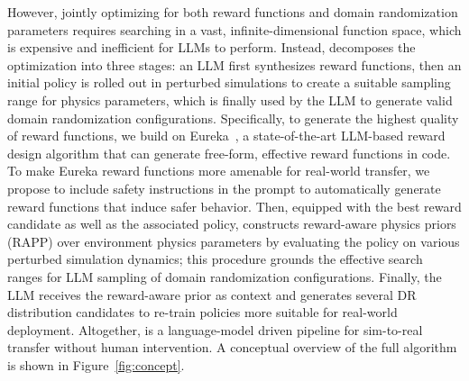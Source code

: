 \documentclass[conference]{IEEEtran}
\begin{document}
However, jointly optimizing for both reward functions and domain randomization parameters requires searching in a vast, infinite-dimensional function space, which is expensive and inefficient for LLMs to perform.
Instead, \ourmethod decomposes the optimization into three stages: an LLM first synthesizes reward functions, then an initial policy is rolled out in perturbed simulations to create a suitable sampling range for physics parameters, which is finally used by the LLM to generate valid domain randomization configurations. Specifically, to generate the highest quality of reward functions, we build on Eureka~\citep{ma2023eureka}, a state-of-the-art LLM-based reward design algorithm that can generate free-form, effective reward functions in code. To make Eureka reward functions more amenable for real-world transfer, we propose to include safety instructions in the prompt to automatically generate reward functions that induce safer behavior. Then, equipped with the best reward candidate as well as the associated policy, \ourmethod constructs reward-aware physics priors (RAPP) over environment physics parameters by evaluating the policy on various perturbed simulation dynamics; this procedure grounds the effective search ranges for LLM sampling of domain randomization configurations. Finally, the LLM receives the reward-aware prior as context and generates several DR distribution candidates to re-train policies more suitable for real-world deployment. Altogether, \ourmethod is a language-model driven pipeline for sim-to-real transfer without human intervention. A conceptual overview of the full algorithm is shown in Figure~\ref{fig:concept}.
\end{document}
